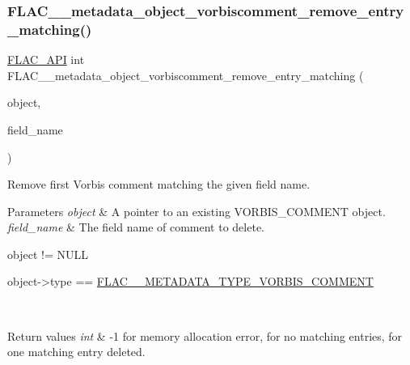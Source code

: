 \subsubsection{\texorpdfstring{F\+L\+A\+C\+\_\+\+\_\+metadata\+\_\+object\+\_\+vorbiscomment\+\_\+remove\+\_\+entry\+\_\+matching()}{FLAC\_\_metadata\_object\_vorbiscomment\_remove\_entry\_matching()}}
{\footnotesize\ttfamily \hyperlink{group__flac__export_ga56ca07df8a23310707732b1c0007d6f5}{F\+L\+A\+C\+\_\+\+A\+PI} int F\+L\+A\+C\+\_\+\+\_\+metadata\+\_\+object\+\_\+vorbiscomment\+\_\+remove\+\_\+entry\+\_\+matching (\begin{DoxyParamCaption}\item[{\hyperlink{struct_f_l_a_c_____stream_metadata}{F\+L\+A\+C\+\_\+\+\_\+\+Stream\+Metadata} $\ast$}]{object,  }\item[{\hyperlink{zconf_8h_a2c212835823e3c54a8ab6d95c652660e}{const} char $\ast$}]{field\+\_\+name }\end{DoxyParamCaption})}

Remove first Vorbis comment matching the given field name.


\begin{DoxyParams}{Parameters}
{\em object} & A pointer to an existing V\+O\+R\+B\+I\+S\+\_\+\+C\+O\+M\+M\+E\+NT object. \\
\hline
{\em field\+\_\+name} & The field name of comment to delete.  
\begin{DoxyCode}
\textcolor{keywordtype}{object} != NULL 
\end{DoxyCode}
 
\begin{DoxyCode}
\textcolor{keywordtype}{object}->type == \hyperlink{group__flac__format_ggac71714ba8ddbbd66d26bb78a427fac01ad013576bc5196b907547739518605520}{FLAC\_\_METADATA\_TYPE\_VORBIS\_COMMENT} 
\end{DoxyCode}
 \\
\hline
\end{DoxyParams}

\begin{DoxyRetVals}{Return values}
{\em int} & {\ttfamily -\/1} for memory allocation error, {} for no matching entries, {} for one matching entry deleted. \\
\hline
\end{DoxyRetVals}
\mbox{\label{group__flac__metadata__object_gabef3625575b7e4c7257617a27220959a}} 
